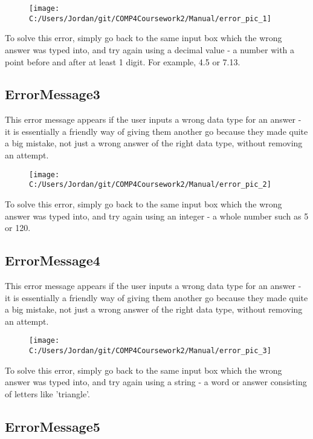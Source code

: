 \begin{figure}[H]
    \texttt{[image: C:/Users/Jordan/git/COMP4Coursework2/Manual/error\_pic\_1]}
\end{figure}

To solve this error, simply go back to the same input box which the wrong answer was typed into, and try again using a decimal value - a number with a point before and after at least 1 digit. For example, 4.5 or 7.13.

\subsection{ErrorMessage3}

This error message appears if the user inputs a wrong data type for an answer - it is essentially a friendly way of giving them another go because they made quite a big mistake, not just a wrong answer of the right data type, without removing an attempt.

\begin{figure}[H]
    \texttt{[image: C:/Users/Jordan/git/COMP4Coursework2/Manual/error\_pic\_2]}
\end{figure}

To solve this error, simply go back to the same input box which the wrong answer was typed into, and try again using an integer - a whole number such as 5 or 120.

\subsection{ErrorMessage4}

This error message appears if the user inputs a wrong data type for an answer - it is essentially a friendly way of giving them another go because they made quite a big mistake, not just a wrong answer of the right data type, without removing an attempt.

\begin{figure}[H]
    \texttt{[image: C:/Users/Jordan/git/COMP4Coursework2/Manual/error\_pic\_3]}
\end{figure}

To solve this error, simply go back to the same input box which the wrong answer was typed into, and try again using a string - a word or answer consisting of letters like 'triangle'.

\subsection{ErrorMessage5}

